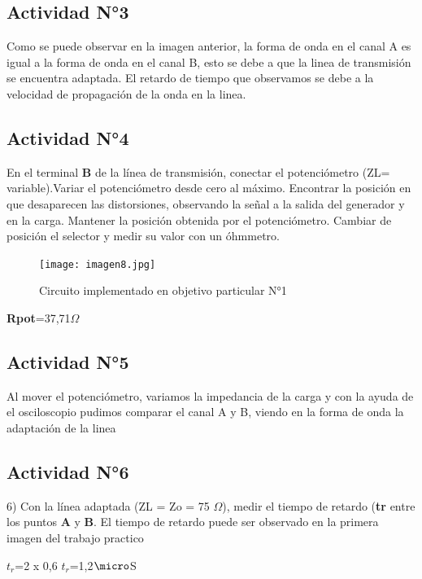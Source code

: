 \documentclass[12pt]{article}
\begin{document}
\subsection{Actividad N°3}
 Como se puede observar en la imagen anterior, la forma de onda en el canal A es igual a la forma de onda en el canal B, esto se debe a que la linea de transmisión se encuentra adaptada.
 El retardo de tiempo que observamos se debe a la velocidad de propagación de la onda en la linea.

\subsection{Actividad N°4}
En el terminal \textbf{B} de la línea de transmisión, conectar el potenciómetro (ZL= variable).Variar el potenciómetro desde cero al máximo.
Encontrar la posición en que desaparecen las distorsiones, observando la señal a la salida del generador y en la carga. Mantener la posición obtenida por el potenciómetro. 
Cambiar de posición el selector y medir su valor con un óhmmetro.

 \begin{center}

\begin{figure}[hbt]
\centering
\texttt{[image: imagen8.jpg]}\\
\caption{Circuito implementado en objetivo particular N°1}
\label{Figura 1}
\end{figure}

 
 \textbf{Rpot}=37,71$\Omega$
\end{center}
             

\subsection{Actividad N°5}
Al mover el potenciómetro, variamos la impedancia de la carga y con la ayuda de el osciloscopio pudimos comparar el canal A y B, viendo en la forma de onda la adaptación de la linea

\subsection{Actividad N°6}
6) Con la línea adaptada (ZL = Zo = 75 $\Omega$), medir el tiempo de retardo (\textbf{tr} entre los puntos \textbf{A} y \textbf{B}.
El tiempo de retardo puede ser observado en la primera imagen del trabajo practico

\begin{center}
$t_r$=2 x 0,6 \hspace{0.5cm} $t_r$=1,2$\micro$S
\end{center}
\end{document}
